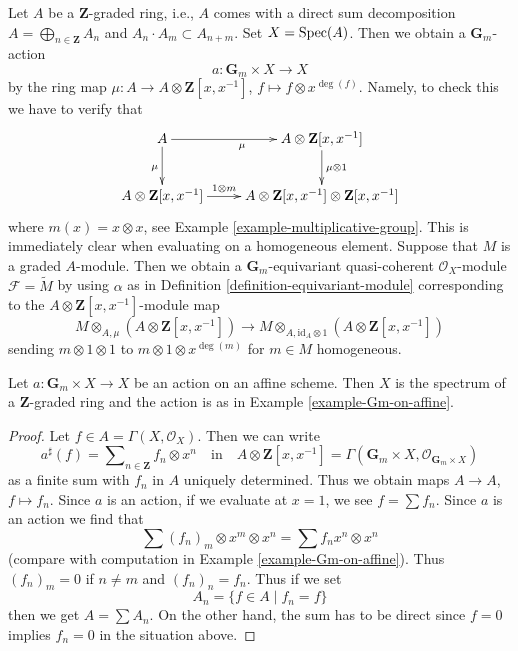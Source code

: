 \begin{example}
\label{example-Gm-on-affine}
Let $A$ be a $\mathbf{Z}$-graded ring, i.e., $A$ comes with a direct
sum decomposition $A = \bigoplus_{n \in \mathbf{Z}} A_n$ and
$A_n \cdot A_m \subset A_{n + m}$.
Set $X = \mathop{\mathrm{Spec}}(A)$. Then we obtain a $\mathbf{G}_m$-action
$$
a : \mathbf{G}_m \times X \longrightarrow X
$$
by the ring map $\mu : A \to A \otimes \mathbf{Z}[x, x^{-1}]$,
$f \mapsto f \otimes x^{\deg(f)}$.
Namely, to check this we have to verify that
$$
\xymatrix{
A \ar[r]_\mu \ar[d]_\mu &
A \otimes \mathbf{Z}[x, x^{-1}] \ar[d]^{\mu \otimes 1} \\
A \otimes \mathbf{Z}[x, x^{-1}] \ar[r]^-{1 \otimes m} &
A \otimes \mathbf{Z}[x, x^{-1}] \otimes \mathbf{Z}[x, x^{-1}]
}
$$
where $m(x) = x \otimes x$, see Example \ref{example-multiplicative-group}.
This is immediately clear when evaluating on a homogeneous element.
Suppose that $M$ is a graded $A$-module. Then we obtain a
$\mathbf{G}_m$-equivariant quasi-coherent $\mathcal{O}_X$-module
$\mathcal{F} = \widetilde{M}$ by using $\alpha$ as in
Definition \ref{definition-equivariant-module} corresponding to the
$A \otimes \mathbf{Z}[x, x^{-1}]$-module map
$$
M \otimes_{A, \mu} (A \otimes \mathbf{Z}[x, x^{-1}])
\longrightarrow
M \otimes_{A, \text{id}_A \otimes 1} (A \otimes \mathbf{Z}[x, x^{-1}])
$$
sending $m \otimes 1 \otimes 1$ to $m \otimes 1 \otimes x^{\deg(m)}$
for $m \in M$ homogeneous.
\end{example}

\begin{lemma}
\label{lemma-complete-reducibility-Gm}
Let $a : \mathbf{G}_m \times X \to X$ be an action on an affine scheme.
Then $X$ is the spectrum of a $\mathbf{Z}$-graded ring
and the action is as in Example \ref{example-Gm-on-affine}.
\end{lemma}

\begin{proof}
Let $f \in A = \Gamma(X, \mathcal{O}_X)$. Then we can write
$$
a^\sharp(f) = \sum\nolimits_{n \in \mathbf{Z}} f_n \otimes x^n
\quad\text{in}\quad
A \otimes \mathbf{Z}[x, x^{-1}] =
\Gamma(\mathbf{G}_m \times X, \mathcal{O}_{\mathbf{G}_m \times X})
$$
as a finite sum with $f_n$ in $A$ uniquely determined.
Thus we obtain maps $A \to A$, $f \mapsto f_n$.
Since $a$ is an action, if we evaluate at $x = 1$,
we see $f = \sum f_n$. Since $a$ is an action
we find that
$$
\sum (f_n)_m \otimes x^m \otimes x^n = \sum f_n x^n \otimes x^n
$$
(compare with computation in Example \ref{example-Gm-on-affine}).
Thus $(f_n)_m = 0$ if $n \not = m$ and $(f_n)_n = f_n$.
Thus if we set
$$
A_n = \{f \in A \mid f_n = f\}
$$
then we get $A = \sum A_n$. On the other hand, the sum has to be
direct since $f = 0$ implies $f_n = 0$ in the situation above.
\end{proof}

